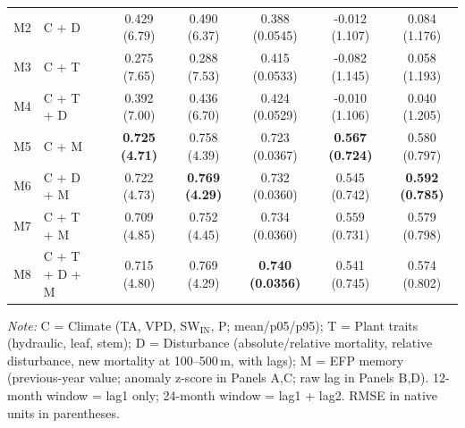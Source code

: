 \begin{table}[htbp]
\begin{tabular}{llcccccc}
M2 & C + D &  & 0.429 (6.79) & 0.490 (6.37) & 0.388 (0.0545) & -0.012 (1.107) & 0.084 (1.176) \\
M3 & C + T &  & 0.275 (7.65) & 0.288 (7.53) & 0.415 (0.0533) & -0.082 (1.145) & 0.058 (1.193) \\
M4 & C + T + D &  & 0.392 (7.00) & 0.436 (6.70) & 0.424 (0.0529) & -0.010 (1.106) & 0.040 (1.205) \\
M5 & C + M &  & \textbf{0.725 (4.71)} & 0.758 (4.39) & 0.723 (0.0367) & \textbf{0.567 (0.724)} & 0.580 (0.797) \\
M6 & C + D + M &  & 0.722 (4.73) & \textbf{0.769 (4.29)} & 0.732 (0.0360) & 0.545 (0.742) & \textbf{0.592 (0.785)} \\
M7 & C + T + M &  & 0.709 (4.85) & 0.752 (4.45) & 0.734 (0.0360) & 0.559 (0.731) & 0.579 (0.798) \\
M8 & C + T + D + M &  & 0.715 (4.80) & 0.769 (4.29) & \textbf{0.740 (0.0356)} & 0.541 (0.745) & 0.574 (0.802) \\
\midrule
\bottomrule
\end{tabular}
\vspace{2pt}
\begin{minipage}{\linewidth}
\footnotesize
\textit{Note:} C = Climate (TA, VPD, SW$_\mathrm{IN}$, P; mean/p05/p95); T = Plant traits (hydraulic, leaf, stem); D = Disturbance (absolute/relative mortality, relative disturbance, new mortality at 100--500\,m, with lags); M = EFP memory (previous-year value; anomaly z-score in Panels A,C; raw lag in Panels B,D). 12-month window = lag1 only; 24-month window = lag1 + lag2. RMSE in native units in parentheses.
\end{minipage}
\end{table}

